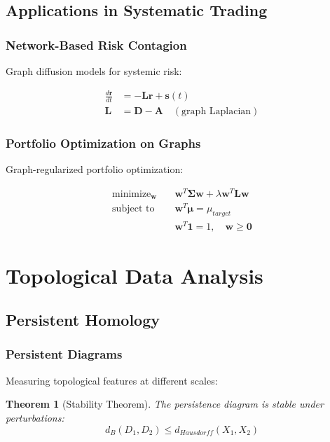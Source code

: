 \documentclass[11pt,letterpaper,openany]{book}
\newtheorem{theorem}{Theorem}[chapter]
\newcommand{\minimize}{\operatorname{minimize}}
\newcommand{\subjectto}{\operatorname{subject\ to}}
\begin{document}
\subsection{Applications in Systematic Trading}

\subsubsection{Network-Based Risk Contagion}

Graph diffusion models for systemic risk:

\begin{align}
\frac{d\mathbf{r}}{dt} &= -\mathbf{L} \mathbf{r} + \mathbf{s}(t) \\
\mathbf{L} &= \mathbf{D} - \mathbf{A} \quad (\text{graph Laplacian})
\end{align}

\subsubsection{Portfolio Optimization on Graphs}

Graph-regularized portfolio optimization:

\begin{align}
\minimize_{\mathbf{w}} \quad & \mathbf{w}^T \boldsymbol{\Sigma} \mathbf{w} + \lambda \mathbf{w}^T \mathbf{L} \mathbf{w} \\
\subjectto \quad & \mathbf{w}^T \boldsymbol{\mu} = \mu_{target} \\
& \mathbf{w}^T \mathbf{1} = 1, \quad \mathbf{w} \geq \mathbf{0}
\end{align}

\section{Topological Data Analysis}

\subsection{Persistent Homology}

\subsubsection{Persistent Diagrams}

Measuring topological features at different scales:

\begin{theorem}[Stability Theorem]
The persistence diagram is stable under perturbations:
\[
d_B(D_1, D_2) \leq d_{Hausdorff}(X_1, X_2)
\]
\end{theorem}
\end{document}
